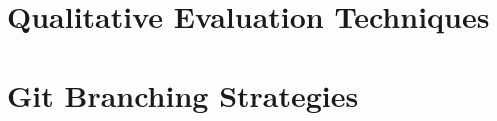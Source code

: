     

\section{Qualitative Evaluation Techniques}
        \blindtext

\section{Git Branching Strategies}
        \blindtext